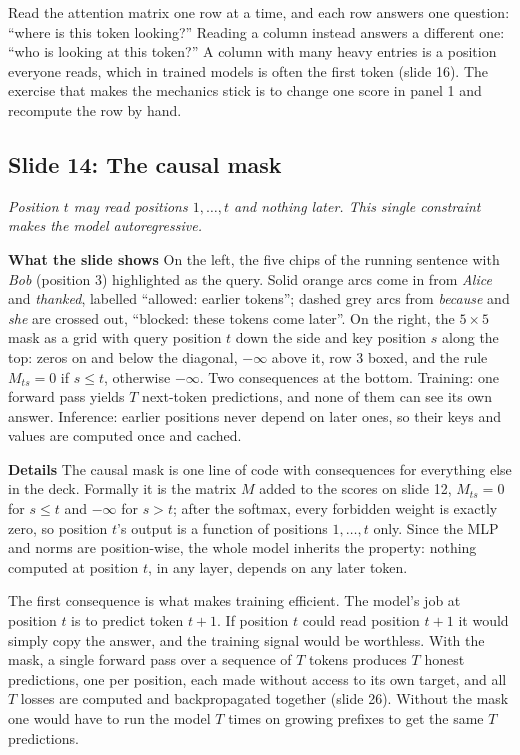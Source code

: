 \documentclass[11pt,letterpaper]{article}
\newcommand{\slide}[3]{%
  \subsection[Slide #1: #2]{Slide #1: #2}%
  {\color{muted}\itshape #3\par}\medskip}
\newcommand{\para}[1]{\medskip\noindent\textbf{#1}\quad}
\newenvironment{intuition}{\begin{tcolorbox}[intuitionbox]}{\end{tcolorbox}}
\begin{document}
\begin{intuition}
Read the attention matrix one row at a time, and each row answers one question: ``where is this token looking?'' Reading a column instead answers a different one: ``who is looking at this token?'' A column with many heavy entries is a position everyone reads, which in trained models is often the first token (slide 16). The exercise that makes the mechanics stick is to change one score in panel 1 and recompute the row by hand.
\end{intuition}

\slide{14}{The causal mask}{Position $t$ may read positions $1,\dots,t$ and nothing later. This single constraint makes the model autoregressive.}

\para{What the slide shows} On the left, the five chips of the running sentence with \emph{Bob} (position 3) highlighted as the query. Solid orange arcs come in from \emph{Alice} and \emph{thanked}, labelled ``allowed: earlier tokens''; dashed grey arcs from \emph{because} and \emph{she} are crossed out, ``blocked: these tokens come later''. On the right, the $5\times5$ mask as a grid with query position $t$ down the side and key position $s$ along the top: zeros on and below the diagonal, $-\infty$ above it, row 3 boxed, and the rule $M_{ts}=0$ if $s\le t$, otherwise $-\infty$. Two consequences at the bottom. Training: one forward pass yields $T$ next-token predictions, and none of them can see its own answer. Inference: earlier positions never depend on later ones, so their keys and values are computed once and cached.

\para{Details} The causal mask is one line of code with consequences for everything else in the deck. Formally it is the matrix $M$ added to the scores on slide 12, $M_{ts}=0$ for $s\le t$ and $-\infty$ for $s>t$; after the softmax, every forbidden weight is exactly zero, so position $t$'s output is a function of positions $1,\dots,t$ only. Since the MLP and norms are position-wise, the whole model inherits the property: nothing computed at position $t$, in any layer, depends on any later token.

The first consequence is what makes training efficient. The model's job at position $t$ is to predict token $t+1$. If position $t$ could read position $t+1$ it would simply copy the answer, and the training signal would be worthless. With the mask, a single forward pass over a sequence of $T$ tokens produces $T$ honest predictions, one per position, each made without access to its own target, and all $T$ losses are computed and backpropagated together (slide 26). Without the mask one would have to run the model $T$ times on growing prefixes to get the same $T$ predictions.
\end{document}
